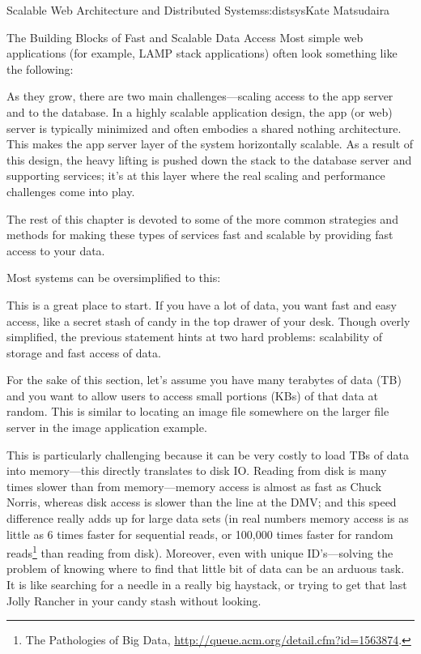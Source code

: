 \begin{aosachapter}{Scalable Web Architecture and Distributed Systems}{s:distsys}{Kate Matsudaira}
\begin{aosasect1}{The Building Blocks of Fast and Scalable Data Access}
Most simple web applications (for example, LAMP stack applications)
often look something like the following:


As they grow, there are two main challenges---scaling access to the
app server and to the database. In a highly scalable application
design, the app (or web) server is typically minimized and often
embodies a shared nothing architecture. This makes the app server
layer of the system horizontally scalable. As a result of this design,
the heavy lifting is pushed down the stack to the database server and
supporting services; it's at this layer where the real scaling and
performance challenges come into play.

The rest of this chapter is devoted to some of the more common
strategies and methods for making these types of services fast and
scalable by providing fast access to your data.

Most systems can be oversimplified to this:


This is a great place to start. If you have a lot of data, you want
fast and easy access, like a secret stash of candy in the top drawer
of your desk. Though overly simplified, the previous statement hints
at two hard problems: scalability of storage and fast access of data.

For the sake of this section, let's assume you have many terabytes of
data (TB) and you want to allow users to access small portions (KBs)
of that data at random. This is similar to locating an image file
somewhere on the larger file server in the image application example.


This is particularly challenging because it can be very costly to load
TBs of data into memory---this directly translates to disk IO. Reading
from disk is many times slower than from memory---memory access is
almost as fast as Chuck Norris, whereas disk access is slower than the
line at the DMV; and this speed difference really adds up for large
data sets (in real numbers memory access is as little as 6 times
faster for sequential reads, or 100,000 times faster for random
reads\footnote{The Pathologies of Big Data,
  \url{http://queue.acm.org/detail.cfm?id=1563874}.} than reading from
disk). Moreover, even with unique ID's---solving the problem of
knowing where to find that little bit of data can be an arduous
task. It is like searching for a needle in a really big haystack, or
trying to get that last Jolly Rancher in your candy stash without
looking.


\end{aosasect1}
\end{aosachapter}
